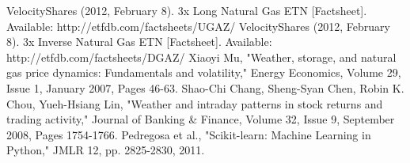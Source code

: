 \documentclass[conference,letterpaper]{IEEEtran}
\begin{document}
\begin{thebibliography}{1}
VelocityShares (2012, February 8). 3x Long Natural Gas ETN [Factsheet]. Available: http://etfdb.com/factsheets/UGAZ/
VelocityShares (2012, February 8). 3x Inverse Natural Gas ETN [Factsheet]. Available: http://etfdb.com/factsheets/DGAZ/
Xiaoyi Mu, "Weather, storage, and natural gas price dynamics: Fundamentals and volatility," Energy Economics, Volume 29, Issue 1, January 2007, Pages 46-63.
Shao-Chi Chang, Sheng-Syan Chen, Robin K. Chou, Yueh-Hsiang Lin, "Weather and intraday patterns in stock returns and trading activity," Journal of Banking \& Finance, Volume 32, Issue 9, September 2008, Pages 1754-1766.
Pedregosa et al., "Scikit-learn: Machine Learning in Python," JMLR 12, pp. 2825-2830, 2011.

\end{thebibliography}
\end{document}
